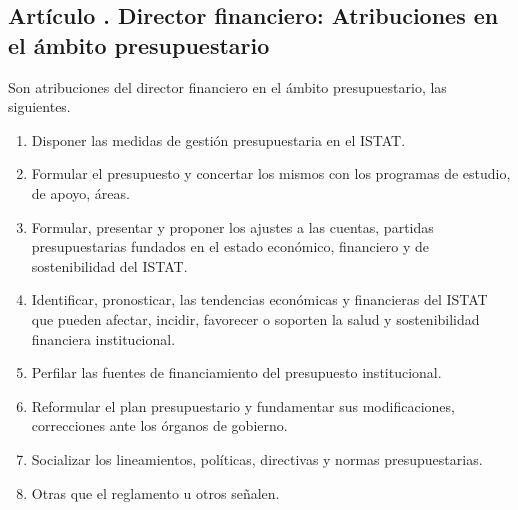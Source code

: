\subsection{Artículo . Director financiero: Atribuciones en el ámbito presupuestario}
\addtocounter{ns}{1}
Son atribuciones del director financiero en el ámbito presupuestario, las siguientes. 
\begin{enumerate}
\item Disponer las medidas de gestión presupuestaria en el ISTAT. 
\item Formular el presupuesto y concertar los mismos con los programas de estudio, de apoyo, áreas. 
\item Formular, presentar y proponer los ajustes a las cuentas, partidas presupuestarias fundados en el estado económico, financiero y de sostenibilidad del ISTAT. 
\item Identificar, pronosticar, las tendencias económicas y financieras del ISTAT que pueden afectar, incidir, favorecer o soporten la salud y sostenibilidad financiera institucional. 
\item Perfilar las fuentes de financiamiento del presupuesto institucional. 
\item Reformular el plan presupuestario y fundamentar sus modificaciones, correcciones ante los órganos de gobierno. 
\item Socializar los lineamientos, políticas, directivas y normas presupuestarias. 
\item Otras que el reglamento u otros señalen. 
\end{enumerate}
